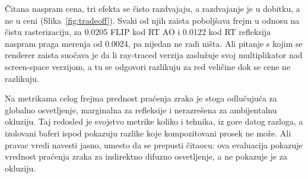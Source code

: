 \v{C}itana naspram cena, tri efekta se \v{c}isto razdvajaju, a razdvajanje je u dobitku,
a ne u ceni (Slika~\ref{fig:tradeoff}). Svaki od njih zaista pobolj\v{s}ava frejm u odnosu na \v{c}istu
rasterizaciju, za 0.0205 FLIP kod RT AO i 0.0122 kod RT refleksija naspram praga merenja od
0.0024, pa nijedan ne radi ni\v{s}ta. Ali pitanje s kojim se renderer zaista suo\v{c}ava je da li
ray-traced verzija zaslu\v{z}uje svoj multiplikator nad screen-space verzijom, a tu se odgovori razlikuju za
red veli\v{c}ine dok se cene ne razlikuju.

Na metrikama celog frejma prednost pra\'cenja zraka je stoga odlu\v{c}uju\'ca za globalno osvetljenje,
marginalna za refleksije i nerazre\v{s}ena za ambijentalnu okluziju. Taj redosled je svojstvo
metrike koliko i tehnika, iz gore datog razloga, a izolovani baferi ispod pokazuju
razlike koje kompozitovani prosek ne mo\v{z}e. Ali pravac vredi navesti jasno, umesto da se
prepusti \v{c}itaocu: ova evaluacija pokazuje vrednost pra\'cenja zraka za indirektno difuzno
osvetljenje, a ne pokazuje je za okluziju.

